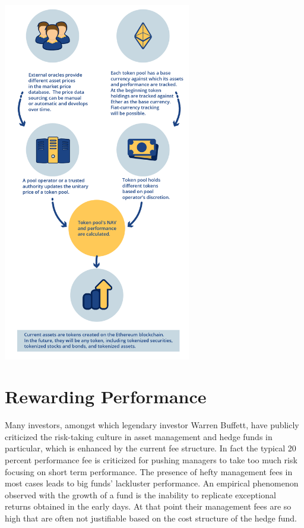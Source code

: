 \documentclass[9pt,oneside]{amsart}
\begin{document}
\begin{multicols}{2}
\includegraphics[width=8.2cm]{pop-tokenomics2.png}

\section{Rewarding Performance}
Many investors, amongst which legendary investor Warren Buffett, have publicly criticized the risk-taking culture in asset management and hedge funds in particular, which is enhanced by the current fee structure. In fact the typical 20 percent performance fee is criticized for pushing managers to take too much risk focusing on short term performance. The presence of hefty management fees in most cases leads to big funds' lackluster performance. An empirical phenomenon observed with the growth of a fund is the inability to replicate exceptional returns obtained in the early days. At that point their management fees are so high that are often not justifiable based on the cost structure of the hedge fund.


\end{multicols}
\end{document}
